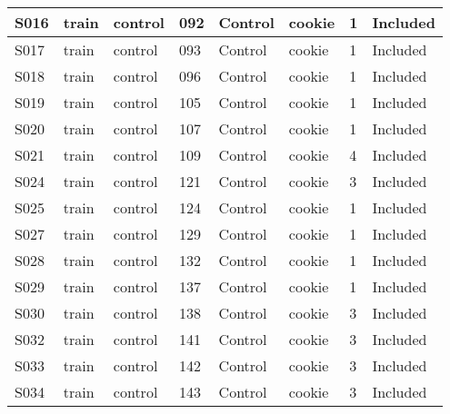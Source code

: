 \begin{center}
\begin{longtable}{|l|l|l|l|l|l|l|l|}
S016           & train                 & control           & 092     & Control        & cookie          & 1            & Included      \\ \hline
S017           & train                 & control           & 093     & Control        & cookie          & 1            & Included      \\ \hline
S018           & train                 & control           & 096     & Control        & cookie          & 1            & Included      \\ \hline
S019           & train                 & control           & 105     & Control        & cookie          & 1            & Included      \\ \hline
S020           & train                 & control           & 107     & Control        & cookie          & 1            & Included      \\ \hline
S021           & train                 & control           & 109     & Control        & cookie          & 4            & Included      \\ \hline
S024           & train                 & control           & 121     & Control        & cookie          & 3            & Included      \\ \hline
S025           & train                 & control           & 124     & Control        & cookie          & 1            & Included      \\ \hline
S027           & train                 & control           & 129     & Control        & cookie          & 1            & Included      \\ \hline
S028           & train                 & control           & 132     & Control        & cookie          & 1            & Included      \\ \hline
S029           & train                 & control           & 137     & Control        & cookie          & 1            & Included      \\ \hline
S030           & train                 & control           & 138     & Control        & cookie          & 3            & Included      \\ \hline
S032           & train                 & control           & 141     & Control        & cookie          & 3            & Included      \\ \hline
S033           & train                 & control           & 142     & Control        & cookie          & 3            & Included      \\ \hline
S034           & train                 & control           & 143     & Control        & cookie          & 3            & Included      \\ \hline

\end{longtable}
\end{center}
